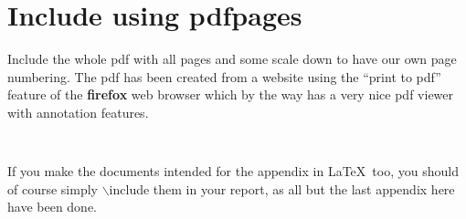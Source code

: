 \chapter{Include using pdfpages}
Include the whole pdf with all pages and some scale down to have our own page numbering.
The pdf has been created from a website using the ``print to pdf'' feature of the \textbf{firefox} web browser which by the way has a very nice pdf viewer with annotation features.
\lstset{language=[LaTeX]TeX}
\begin{lstlisting}[caption={code to include next pages as pdf}]
 
\end{lstlisting}

If you make the documents intended for the appendix in \LaTeX\ too, you should of course simply $\backslash$include them in your report, as all but the last appendix here have been done.



